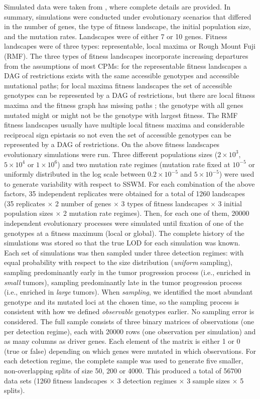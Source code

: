 \documentclass[a4paper,10pt]{article}
\begin{document}
Simulated data were taken from \cite{diaz-uriarte2019a}, where complete
details are provided. In summary, simulations were conducted under
evolutionary scenarios that differed in the number of genes, the type of
fitness landscape, the initial population size, and the mutation
rates. Landscapes were of either 7 or 10 genes. Fitness landscapes were of
three types: representable, local maxima or Rough Mount Fuji (RMF). The
three types of fitness landscapes incorporate increasing departures from
the assumptions of most CPMs: for the representable fitness landscapes a
DAG of restrictions exists with the same accessible genotypes and
accessible mutational paths; for local maxima fitness landscapes the set
of accessible genotypes can be represented by a DAG of restrictions, but
there are local fitness maxima and the fitness graph has missing paths
\cite{diaz-uriarte2019a}; the genotype with all genes mutated might or
might not be the genotype with largest fitness. The RMF fitness landscapes
\cite{neidhart_adaptation_2014, devisser_empirical_2014,fragata2019}
usually have multiple local fitness maxima and considerable reciprocal
sign epistasis so not even the set of accessible genotypes can be
represented by a DAG of restrictions. On the above fitness landscapes
evolutionary simulations were run. Three different populations sizes
($2\times10^3$, $5\times10^4$ or $1\times10^6$) and two mutation rate
regimes (mutation rate fixed at $10^{-5}$ or uniformly distributed in the
log scale between $0.2\times10^{-5}$ and $5\times10^{-5}$) were used to
generate variability with respect to SSWM. For each combination of the
above factors, 35 independent replicates were obtained for a total of 1260
landscapes (35 replicates $\times$ 2 number of genes $\times$ 3 types of
fitness landscapes $\times$ 3 initial population sizes $\times$ 2 mutation
rate regimes). Then, for each one of them, 20000 independent evolutionary
processes were simulated until fixation of one of the genotypes at a
fitness maximum (local or global). The complete history of the simulations
was stored so that the true LOD for each simulation was known. Each set of
simulations was then sampled under three detection regimes: with equal
probability with respect to the size distribution (\textit{uniform}
sampling), sampling predominantly early in the tumor progression process
(i.e., enriched in \textit{small} tumors), sampling predominantly late in
the tumor progression process (i.e., enriched in \textit{large}
tumors). When \textit{sampling}, we identified the most abundant genotype
and its mutated loci at the chosen time, so the sampling process is
consistent with how we defined \textit{observable} genotypes earlier. No
sampling error is considered. The full sample consists of three binary
matrices of observations (one per detection regime), each with 20000 rows
(one observation per simulation) and as many columns as driver genes. Each
element of the matrix is either 1 or 0 (true or false) depending on which
genes were mutated in which observations. For each detection regime, the
complete sample was used to generate five smaller, non-overlapping splits
of size 50, 200 or 4000. This produced a total of 56700 data sets (1260
fitness landscapes $\times$ 3 detection regimes $\times$ 3 sample sizes
$\times$ 5 splits).
\end{document}
